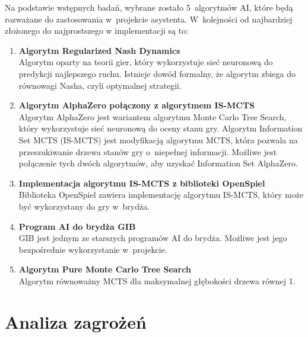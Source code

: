 Na podstawie wstępnych badań, wybrane zostało 5~algorytmów AI,
które będą rozważane do zastosowania w~projekcie asystenta.
W~kolejności od najbardziej złożonego do
najprostszego w implementacji są to:
\begin{enumerate}
    \item \textbf{Algorytm Regularized Nash Dynamics \cite{doi:10.1126/science.add4679}}\\
          Algorytm oparty na teorii gier, który wykorzystuje sieć neuronową do
          predykcji najlepszego ruchu. Istnieje dowód formalny, że algorytm
          zbiega do równowagi Nasha, czyli optymalnej strategii.

    \item \textbf{Algorytm AlphaZero \cite{AlphaZeroPaper} połączony z algorytmem IS-MCTS \cite{6203567}}\\
          Algorytm AlphaZero jest wariantem algorytmu Monte Carlo Tree Search,
          który wykorzystuje sieć neuronową do oceny stanu gry.
          Algorytm Information Set MCTS (IS-MCTS) jest modyfikacją algorytmu MCTS, która pozwala na
          przeszukiwanie drzewa stanów gry o~niepełnej informacji.
          Możliwe jest połączenie tych dwóch algorytmów, aby uzyskać
          Information Set AlphaZero.

    \item \textbf{Implementacja algorytmu IS-MCTS z biblioteki OpenSpiel \cite{LanctotEtAl2019OpenSpiel}}\\
          Biblioteka OpenSpiel zawiera implementację algorytmu IS-MCTS,
          który może być wykorzystany do gry w~brydża.

    \item \textbf{Program AI do brydża GIB \cite{Ginsberg1999GIBST}}\\
          GIB jest jednym ze starszych programów AI do brydża. Możliwe jest
          jego bezpośrednie wykorzystanie w~projekcie.

    \item \textbf{Algorytm Pure Monte Carlo Tree Search \cite{pmcts}}\\
          Algorytm równoważny MCTS dla maksymalnej głębokości drzewa równej 1.
\end{enumerate}



\section{Analiza zagrożeń}
\label{sec:analiza_zagrozen}

